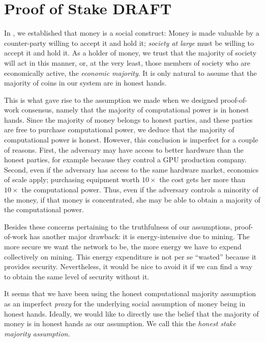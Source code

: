 \chapter{Proof of Stake \small{\textsf{DRAFT}}}\label{chapter.stake}

In , we established that money is a social construct:
Money is made valuable by a counter-party willing to accept it and hold it;
\emph{society at large} must be willing to accept it and hold it.
As a holder of money, we trust that the majority of society will act in this manner,
or, at the very least, those members of society who are economically active,
the \emph{economic majority}. It is only natural to assume that the majority of
coins in our system are in honest hands.

This is what gave rise to the assumption we made when we designed proof-of-work consensus,
namely that the majority of computational power is in honest hands. Since the majority of
money belongs to honest parties, and these parties are free to purchase computational power,
we deduce that the majority of computational power is honest. However, this conclusion is imperfect
for a couple of reasons. First, the adversary may have access to better hardware than the honest
parties, for example because they control a GPU production company. Second, even if the adversary
has access to the same hardware market, economics of scale apply; purchasing equipment
worth $10\times$ the cost gets her more than $10\times$ the computational power. Thus,
even if the adversary controls a minority of the money, if that money is concentrated,
she may be able to obtain a majority of the computational power.

Besides these concerns pertaining to the truthfulness of our assumptions,
proof-of-work has another major drawback: it is energy-intensive due to mining.
The more secure we want the network to be, the more energy we have to expend collectively
on mining. This energy expenditure is not per se ``wasted'' because it provides security.
Nevertheless, it would be nice to avoid it if we can find a way to obtain the same level
of security without it.

It seems that we have been using the honest computational majority assumption as an
imperfect \emph{proxy} for the underlying social assumption of money being in honest hands.
Ideally, we would like to directly use the belief that the majority of money is in honest hands
as our assumption. We call this the \emph{honest stake majority assumption}.

